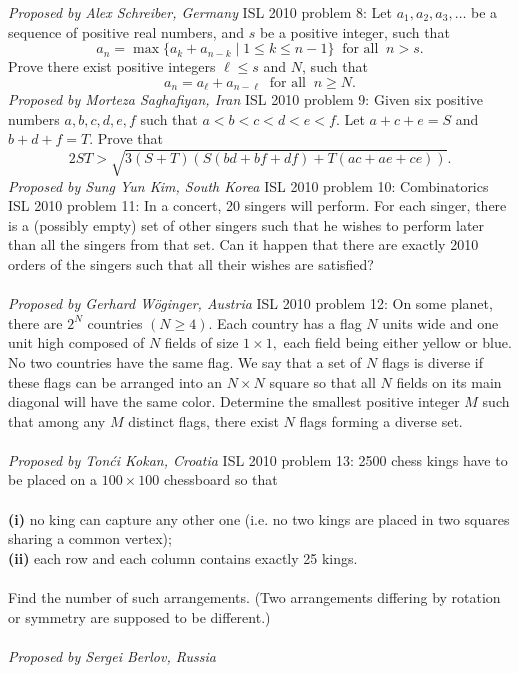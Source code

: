 \textit{Proposed by Alex Schreiber, Germany} 
ISL 2010 problem 8:  Let $a_1, a_2, a_3, \ldots$ be a sequence of positive real numbers, and $s$ be a positive integer, such that
\[ a_n = \max \{ a_k + a_{n-k} \mid 1 \leq k \leq n-1 \} \ \textrm{ for all } \ n > s. \]
Prove there exist positive integers $\ell \leq s$ and $N$, such that
\[ a_n = a_{\ell} + a_{n - \ell} \ \textrm{ for all } \ n \geq N. \]
\textit{Proposed by Morteza Saghafiyan, Iran} 
ISL 2010 problem 9:  Given six positive numbers $a,b,c,d,e,f$ such that $a < b < c < d < e < f.$ Let $a+c+e=S$ and $b+d+f=T.$ Prove that
\[ 2ST > \sqrt{3(S+T)\left(S(bd + bf + df) + T(ac + ae + ce) \right)}. \]
\textit{Proposed by Sung Yun Kim, South Korea} 
ISL 2010 problem 10:  Combinatorics 
ISL 2010 problem 11:  In a concert, 20 singers will perform. For each singer, there is a (possibly empty) set of other singers such that he wishes to perform later than all the singers from that set. Can it happen that there are exactly 2010 orders of the singers such that all their wishes are satisfied? \\\\
\textit{Proposed by Gerhard Wöginger, Austria} 
ISL 2010 problem 12:  On some planet, there are $2^N$ countries $(N \geq 4).$ Each country has a flag $N$ units wide and one unit high composed of $N$ fields of size $1 \times 1,$ each field being either yellow or blue. No two countries have the same flag. We say that a set of $N$ flags is diverse if these flags can be arranged into an $N \times N$ square so that all $N$ fields on its main diagonal will have the same color. Determine the smallest positive integer $M$ such that among any $M$ distinct flags, there exist $N$ flags forming a diverse set. \\\\
\textit{Proposed by Tonći Kokan, Croatia} 
ISL 2010 problem 13:  2500 chess kings have to be placed on a $100 \times 100$ chessboard so that \\\\
\textbf{(i)} no king can capture any other one (i.e. no two kings are placed in two squares sharing a common vertex); \\
\textbf{(ii)} each row and each column contains exactly 25 kings. \\\\
Find the number of such arrangements. (Two arrangements differing by rotation or symmetry are supposed to be different.) \\\\
\textit{Proposed by Sergei Berlov, Russia} 
